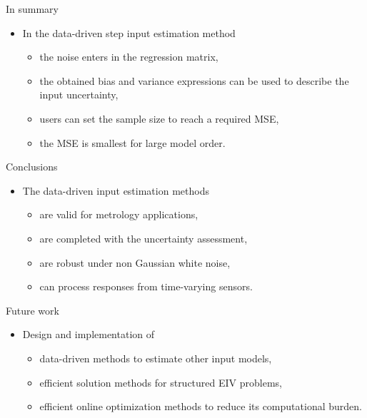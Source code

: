\documentclass[presentation]{beamer}
\newcommand\Wider[2][3em]{%
\makebox[\linewidth][c]{%
  \begin{minipage}{\dimexpr\textwidth+#1\relax}
  \raggedright#2
  \end{minipage}%
  }%
}
\begin{document}
\begin{frame}[label={slide:conclusions}]{In summary}
\begin{itemize}
	\item In the data-driven step input estimation method
	\vspace{3mm}
	\begin{itemize}
		\item the noise enters in the regression matrix,
		\vspace{2mm}
		\item the obtained bias and variance expressions can be used to describe the input uncertainty,
		\vspace{2mm}
		\item users can set the sample size to reach a required MSE,
		\vspace{2mm}
		\item the MSE is smallest for large model order.
	\end{itemize}
\end{itemize}
\end{frame}

\begin{frame}[label={slide:conclusions}]{Conclusions}
\begin{itemize}
	\item  The data-driven input estimation methods
	\vspace{3mm}
	\begin{itemize}
		\item are valid for metrology applications,
		\vspace{2mm}
		\item are completed with the uncertainty assessment,
		\vspace{2mm}
		\item are robust under non Gaussian white noise,
		\vspace{2mm}
		\item can process responses from time-varying sensors.  
	\end{itemize}
\end{itemize}
\end{frame}

\begin{frame}[label={slide:conclusions}]{Future work}
\begin{itemize}
	\item Design and implementation of
	\vspace{3mm}
	\begin{itemize}
		\item data-driven methods to estimate other input models,
		\vspace{2mm}
		\item efficient solution methods for structured EIV problems,
		\vspace{2mm}
		\item efficient online optimization methods to reduce its computational burden.
	\end{itemize}   
\end{itemize}
\end{frame}

\begin{frame}
\Wider{\maketitle}
\end{frame}
\end{document}
